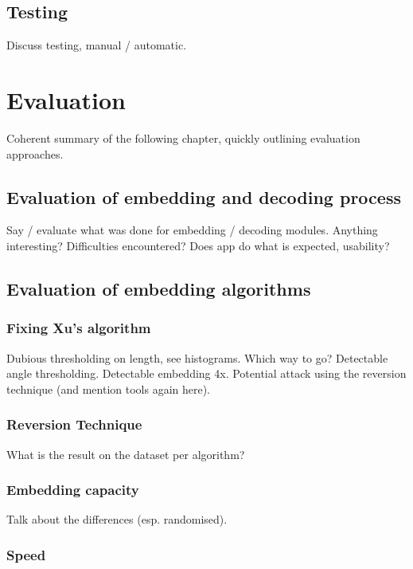 \documentclass[12pt,british,twoside,notitlepage,usenames,dvipsnames,hypens,final]{report}
\numberwithin{equation}{section}
\numberwithin{figure}{section}
\begin{document}
\section{Testing}

Discuss testing, manual / automatic.

\cleardoublepage
\chapter{Evaluation}

Coherent summary of the following chapter, quickly outlining evaluation approaches.

\section{Evaluation of embedding and decoding process}

Say / evaluate what was done for embedding / decoding modules. Anything interesting? Difficulties encountered? Does app do what is expected, usability?

\section{Evaluation of embedding algorithms}

\subsection{Fixing Xu's algorithm}

Dubious thresholding on length, see histograms. Which way to go?
Detectable angle thresholding.
Detectable embedding 4x.
Potential attack using the reversion technique (and mention tools again here).

\subsection{Reversion Technique}
\label{rev-tech}

What is the result on the dataset per algorithm?

\subsection{Embedding capacity}

Talk about the differences (esp. randomised).

\subsection{Speed}
\end{document}
